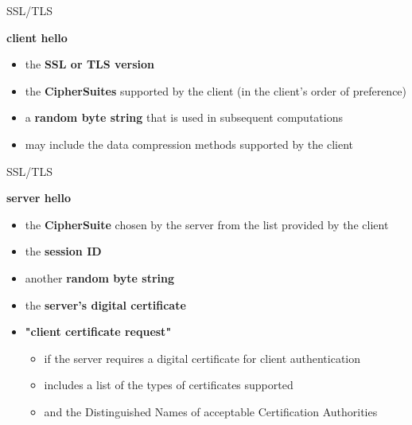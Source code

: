 \documentclass[pdf]{beamer}
\begin{document}
\begin{frame}{SSL/TLS}

\textbf{client hello}

\begin{itemize}
\item
the \textbf{SSL or TLS version}

\item
the \textbf{CipherSuites} supported by the client (in the client's order of preference)

\item
a \textbf{random byte string} that is used in subsequent computations

\item
may include the data compression methods supported by the client
\end{itemize}
\end{frame}



\begin{frame}{SSL/TLS}

\textbf{server hello}

\begin{itemize}
\item
the \textbf{CipherSuite} chosen by the server from the list provided by the client

\item
the \textbf{session ID}

\item
another \textbf{random byte string}

\item
the \textbf{server's digital certificate}

\item
\textbf{"client certificate request"}

\begin{itemize}
\item
if the server requires a digital certificate for client authentication

\item
includes a list of the types of certificates supported

\item
and the Distinguished Names of acceptable Certification Authorities
\end{itemize}

\end{itemize}
\end{frame}
\end{document}
